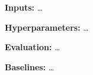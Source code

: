 


\textbf{Inputs:} \ldots

\textbf{Hyperparameters:} \ldots

\textbf{Evaluation:} \ldots

\textbf{Baselines:} \ldots

